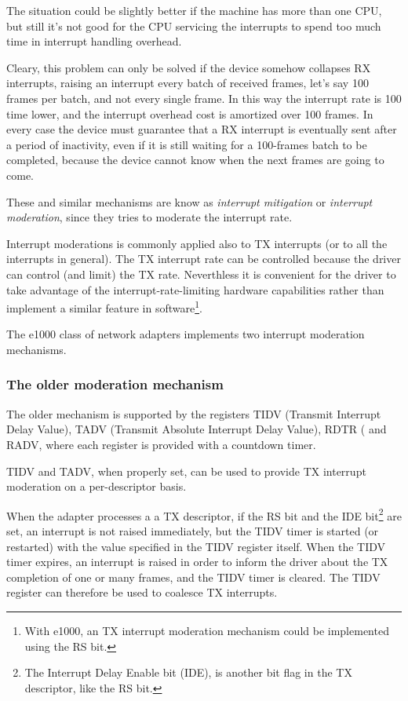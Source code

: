 The situation could be slightly better if the machine has more than one CPU, but still it's not good for the CPU servicing the interrupts
to spend too much time in interrupt handling overhead.

\vspace{0.5cm}

Cleary, this problem can only be solved if the device somehow collapses RX interrupts, raising an interrupt every batch of received
frames, let's say 100 frames per batch, and not every single frame. In this way the interrupt rate is 100 time lower, and the
interrupt overhead cost is amortized over 100 frames.
In every case the device must guarantee that a RX interrupt is eventually sent after a period of inactivity, even if it is still waiting
for a 100-frames batch to be completed, because the device cannot know when the next frames are going to come.

These and similar mechanisms are know as \emph{interrupt mitigation} or \emph{interrupt moderation}, since they tries to moderate the
interrupt rate.

Interrupt moderations is commonly applied also to TX interrupts (or to all the interrupts in general). The TX interrupt rate can be
controlled because the driver can control (and limit) the TX rate. Neverthless it is convenient for the driver to take advantage of
the interrupt-rate-limiting hardware capabilities rather than implement a similar feature in software\footnote{With e1000, an TX 
interrupt moderation mechanism could be implemented using the RS bit.}.

\vspace{0.5cm}

The e1000 class of network adapters implements two interrupt moderation mechanisms.

\subsubsection{The older moderation mechanism}
The older mechanism is supported by the registers TIDV (Transmit Interrupt Delay Value), TADV (Transmit Absolute Interrupt Delay Value),
RDTR ( and RADV, where each register is provided with a countdown timer.

\vspace{0.5cm}

TIDV and TADV, when properly set, can be used to provide TX interrupt moderation on a per-descriptor basis.

When the adapter processes a a TX descriptor, if the RS bit and the IDE bit\footnote{The Interrupt Delay Enable bit (IDE), is another
bit flag in the TX descriptor, like the RS bit.} are set, an interrupt is not raised immediately, but the TIDV timer is started (or
restarted) with the value specified in the TIDV register itself. When the TIDV timer expires, an interrupt is raised in order
to inform the driver about the TX completion of one or many frames, and the TIDV timer is cleared.
The TIDV register can therefore be used to coalesce TX interrupts.

